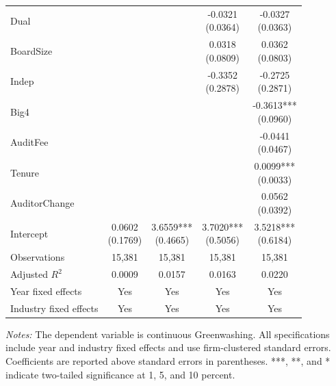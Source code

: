 \begin{table}[htbp]
{\begin{tabular}{@{}lcccc@{}}
Dual &  &  & \shortstack{-0.0321\\(0.0364)} & \shortstack{-0.0327\\(0.0363)}\\[4pt]
BoardSize &  &  & \shortstack{0.0318\\(0.0809)} & \shortstack{0.0362\\(0.0803)}\\[4pt]
Indep &  &  & \shortstack{-0.3352\\(0.2878)} & \shortstack{-0.2725\\(0.2871)}\\[4pt]
Big4 &  &  &  & \shortstack{-0.3613***\\(0.0960)}\\[4pt]
AuditFee &  &  &  & \shortstack{-0.0441\\(0.0467)}\\[4pt]
Tenure &  &  &  & \shortstack{0.0099***\\(0.0033)}\\[4pt]
AuditorChange &  &  &  & \shortstack{0.0562\\(0.0392)}\\[4pt]
Intercept & \shortstack{0.0602\\(0.1769)} & \shortstack{3.6559***\\(0.4665)} & \shortstack{3.7020***\\(0.5056)} & \shortstack{3.5218***\\(0.6184)}\\[4pt]
Observations & 15,381 & 15,381 & 15,381 & 15,381\\
Adjusted \(R^2\) & 0.0009 & 0.0157 & 0.0163 & 0.0220\\
Year fixed effects & Yes & Yes & Yes & Yes\\
Industry fixed effects & Yes & Yes & Yes & Yes\\
\hline\end{tabular}}
\vspace{0.4em}
\begin{minipage}{0.92\textwidth}\footnotesize\textit{Notes:} The dependent variable is continuous Greenwashing. All specifications include year and industry fixed effects and use firm-clustered standard errors. Coefficients are reported above standard errors in parentheses. ***, **, and * indicate two-tailed significance at 1, 5, and 10 percent.\end{minipage}
\end{table}